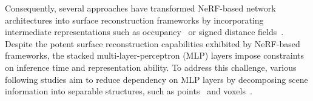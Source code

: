 \documentclass[lettersize,journal]{IEEEtran}
\begin{document}
Consequently, several approaches have transformed NeRF-based network architectures into surface reconstruction frameworks by incorporating intermediate representations such as occupancy~\cite{Niemeyer:2020:Differentiable} or signed distance fields~\cite{wang2021neus, Yariv:2021:Volume}. Despite the potent surface reconstruction capabilities exhibited by NeRF-based frameworks, the stacked multi-layer-perceptron (MLP) layers impose constraints on inference time and representation ability. To address this challenge, various following studies aim to reduce dependency on MLP layers by decomposing scene information into separable structures, such as points~\cite{xu2022point} and voxels~\cite{Liu:2020:Neural, li2022vox, li2023neuralangelo}.

\end{document}
